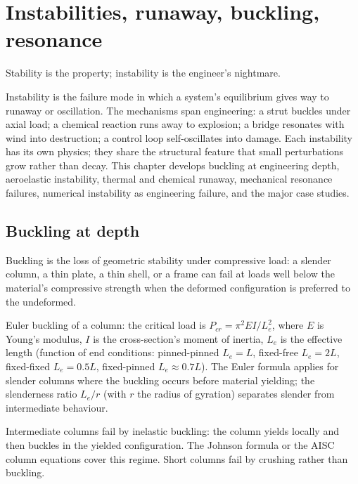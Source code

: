 \chapter{Instabilities, runaway, buckling, resonance}
\label{vol10:ch04}

\epigraph{Stability is the property; instability is the engineer's nightmare.}{}


\noindent
Instability is the failure mode in which a system's equilibrium gives way to runaway or oscillation. The mechanisms span engineering: a strut buckles under axial load; a chemical reaction runs away to explosion; a bridge resonates with wind into destruction; a control loop self-oscillates into damage. Each instability has its own physics; they share the structural feature that small perturbations grow rather than decay. This chapter develops buckling at engineering depth, aeroelastic instability, thermal and chemical runaway, mechanical resonance failures, numerical instability as engineering failure, and the major case studies.

\section{Buckling at depth}

Buckling is the loss of geometric stability under compressive load: a slender column, a thin plate, a thin shell, or a frame can fail at loads well below the material's compressive strength when the deformed configuration is preferred to the undeformed.

Euler buckling of a column: the critical load is $P_{cr} = \pi^2 E I / L_e^2$, where $E$ is Young's modulus, $I$ is the cross-section's moment of inertia, $L_e$ is the effective length (function of end conditions: pinned-pinned $L_e = L$, fixed-free $L_e = 2L$, fixed-fixed $L_e = 0.5L$, fixed-pinned $L_e \approx 0.7L$). The Euler formula applies for slender columns where the buckling occurs before material yielding; the slenderness ratio $L_e/r$ (with $r$ the radius of gyration) separates slender from intermediate behaviour.

Intermediate columns fail by inelastic buckling: the column yields locally and then buckles in the yielded configuration. The Johnson formula or the AISC column equations cover this regime. Short columns fail by crushing rather than buckling.

